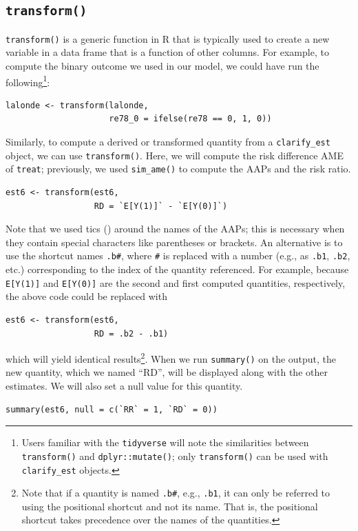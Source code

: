 \subsection{\texorpdfstring{\texttt{transform()}}{transform()}}\label{transform}
\texttt{transform()} is a generic function in R that is typically used to create a new variable in a data frame that is a function of other columns. For example, to compute the binary outcome we used in our model, we could have run the following\footnote{Users familiar with the \texttt{tidyverse} will note the similarities between \texttt{transform()} and \texttt{dplyr::mutate()}; only \texttt{transform()} can be used with \texttt{clarify\_est} objects.}:
\begin{verbatim}
lalonde <- transform(lalonde,
                     re78_0 = ifelse(re78 == 0, 1, 0))
\end{verbatim}
Similarly, to compute a derived or transformed quantity from a \texttt{clarify\_est} object, we can use \texttt{transform()}. Here, we will compute the risk difference AME of \texttt{treat}; previously, we used \texttt{sim\_ame()} to compute the AAPs and the risk ratio.
\begin{verbatim}
est6 <- transform(est6,
                  RD = `E[Y(1)]` - `E[Y(0)]`)
\end{verbatim}
Note that we used tics (\texttt{\textasciigrave{}}) around the names of the AAPs; this is necessary when they contain special characters like parentheses or brackets. An alternative is to use the shortcut names \texttt{.b\#}, where \texttt{\#} is replaced with a number (e.g., as \texttt{.b1}, \texttt{.b2}, etc.) corresponding to the index of the quantity referenced. For example, because \texttt{E{[}Y(1){]}} and \texttt{E{[}Y(0){]}} are the second and first computed quantities, respectively, the above code could be replaced with
\begin{verbatim}
est6 <- transform(est6,
                  RD = .b2 - .b1)
\end{verbatim}
which will yield identical results\footnote{Note that if a quantity is named \texttt{.b\#}, e.g., \texttt{.b1}, it can only be referred to using the positional shortcut and not its name. That is, the positional shortcut takes precedence over the names of the quantities.}.
When we run \texttt{summary()} on the output, the new quantity, which we named ``RD'', will be displayed along with the other estimates. We will also set a null value for this quantity.
\begin{verbatim}
summary(est6, null = c(`RR` = 1, `RD` = 0))
\end{verbatim}
